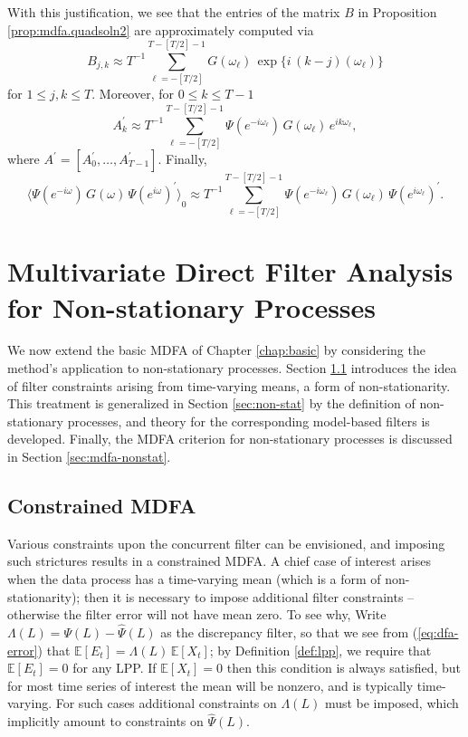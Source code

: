 \documentclass[a4paper]{book}
\def\EE{\mathbb E}
\begin{document}
With this justification, we see that the entries of the matrix $B$ in 
 Proposition \ref{prop:mdfa.quadsoln2} are approximately computed via
\[
  B_{j,k} \approx T^{-1} \sum_{\ell=-[T/2]}^{T-[T/2]-1} G (\omega_{\ell}) \,
   \exp \{ i \, (k-j) (\omega_{\ell}) \}
\]
 for $1 \leq j,k \leq T$.  Moreover, for $0 \leq k \leq T-1$
\[
  A_k^{\prime} \approx T^{-1}  \sum_{\ell=-[T/2]}^{T-[T/2]-1} \Psi 
	( e^{ -i \omega_{\ell} }) \,     G (\omega_{\ell}) \,
   e^{ i  k \omega_{\ell} },
\]
 where $A^{\prime} = [ A_0^{\prime}, \ldots, A_{T-1}^{\prime} ]$.  Finally,
\[
  { \langle \Psi (e^{-i \omega}) \, G (\omega)  \, { \Psi (e^{i \omega}) }^{\prime} \rangle }_0 \approx
  T^{-1}  \sum_{\ell=-[T/2]}^{T-[T/2]-1}  \Psi 
	( e^{ -i  \omega_{\ell} } ) \,
     G (\omega_{\ell}) \,  {\Psi  ( e^{ i \omega_{\ell} } ) }^{\prime}.
\]
 
 



\chapter{Multivariate Direct Filter Analysis for Non-stationary Processes}
\label{chap:int}

 We now extend the basic MDFA of Chapter \ref{chap:basic}  by considering
 the method's application to  non-stationary processes.  
 Section \ref{sec:constraint} introduces the idea of filter constraints
arising from time-varying means, a form of non-stationarity.
 This treatment is generalized in Section \ref{sec:non-stat}
  by the definition of non-stationary processes, and theory for the corresponding
   model-based filters is developed.  Finally, the MDFA criterion for
    non-stationary processes is discussed in Section \ref{sec:mdfa-nonstat}.
 

\section{Constrained MDFA}
\label{sec:constraint}

 Various constraints upon the concurrent filter can be envisioned, 
   and imposing such strictures results in  a constrained MDFA. 
   A chief case of interest arises when the 
    data process has a time-varying mean (which is a form of  non-stationarity);
  then it is necessary to impose additional filter constraints -- otherwise
   the filter error will not have mean zero.    To see why, 
   Write $\Lambda (L) = \Psi (L) - \widehat{\Psi} (L)$ as the discrepancy filter,
   so that we see  from (\ref{eq:dfa-error})  
   that $\EE [ E_t ] = \Lambda (L) \, \EE [ X_t ]$; 
   by Definition \ref{def:lpp}, we require
 that $\EE [ E_t ] = 0$ for any LPP.  
  If $\EE [ X_t] = 0$ then this condition is always satisfied, but
   for most time series of interest the mean will be nonzero, and is typically
    time-varying.  For such cases additional constraints on $\Lambda (L)$ must be imposed,
    which implicitly amount to constraints on $\widehat{\Psi} (L)$.
    
\end{document}
